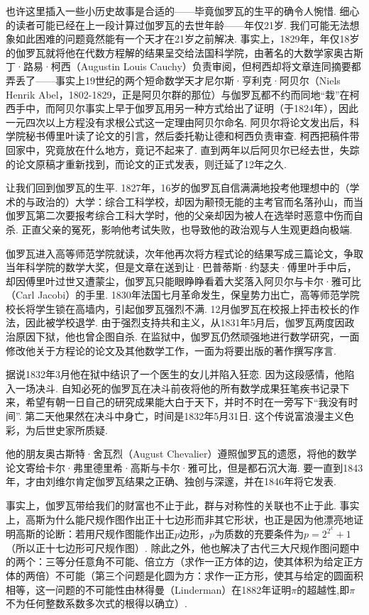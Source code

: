 也许这里插入一些小历史故事是合适的——毕竟伽罗瓦的生平的确令人惋惜. 细心的读者可能已经在上一段计算过伽罗瓦的去世年龄——年仅21岁. 我们可能无法想象如此困难的问题竟然能有一个天才在21岁之前解决. 事实上，1829年，年仅18岁的伽罗瓦就将他在代数方程解的结果呈交给法国科学院，由著名的大数学家奥古斯丁·路易·柯西（Augustin Louis Cauchy）负责审阅，但柯西却将文章连同摘要都弄丢了——事实上19世纪的两个短命数学天才尼尔斯·亨利克·阿贝尔（Niels Henrik Abel，1802-1829，正是阿贝尔群的那位）与伽罗瓦都不约而同地``栽''在柯西手中，而阿贝尔事实上早于伽罗瓦用另一种方式给出了证明（于1824年），因此一元四次以上方程没有求根公式这一定理由阿贝尔命名. 阿贝尔将论文发出后，科学院秘书傅里叶读了论文的引言，然后委托勒让德和柯西负责审查. 柯西把稿件带回家中，究竟放在什么地方，竟记不起来了. 直到两年以后阿贝尔已经去世，失踪的论文原稿才重新找到，而论文的正式发表，则迁延了12年之久.

让我们回到伽罗瓦的生平. 1827年，16岁的伽罗瓦自信满满地投考他理想中的（学术的与政治的）大学：综合工科学校，却因为颟顸无能的主考官而名落孙山，而当伽罗瓦第二次要报考综合工科大学时，他的父亲却因为被人在选举时恶意中伤而自杀. 正直父亲的冤死，影响他考试失败，也导致他的政治观与人生观更趋向极端.

伽罗瓦进入高等师范学院就读，次年他再次将方程式论的结果写成三篇论文，争取当年科学院的数学大奖，但是文章在送到让·巴普蒂斯·约瑟夫·傅里叶手中后，却因傅里叶过世又遭蒙尘，伽罗瓦只能眼睁睁看着大奖落入阿贝尔与卡尔·雅可比（Carl Jacobi）的手里. 1830年法国七月革命发生，保皇势力出亡，高等师范学院校长将学生锁在高墙内，引起伽罗瓦强烈不满. 12月伽罗瓦在校报上抨击校长的作法，因此被学校退学. 由于强烈支持共和主义，从1831年5月后，伽罗瓦两度因政治原因下狱，他也曾企图自杀. 在监狱中，伽罗瓦仍然顽强地进行数学研究，一面修改他关于方程论的论文及其他数学工作，一面为将要出版的著作撰写序言.

据说1832年3月他在狱中结识了一个医生的女儿并陷入狂恋. 因为这段感情，他陷入一场决斗. 自知必死的伽罗瓦在决斗前夜将他的所有数学成果狂笔疾书记录下来，希望有朝一日自己的研究成果能大白于天下，并时不时在一旁写下``我没有时间''. 第二天他果然在决斗中身亡，时间是1832年5月31日. 这个传说富浪漫主义色彩，为后世史家所质疑.

他的朋友奥古斯特·舍瓦烈（August Chevalier）遵照伽罗瓦的遗愿，将他的数学论文寄给卡尔·弗里德里希·高斯与卡尔·雅可比，但是都石沉大海. 要一直到1843年，才由刘维尔肯定伽罗瓦结果之正确、独创与深邃，并在1846年将它发表.

事实上，伽罗瓦带给我们的财富也不止于此，群与对称性的关联也不止于此. 事实上，高斯为什么能尺规作图作出正十七边形而非其它形状，也正是因为他漂亮地证明高斯的论断：若用尺规作图能作出正$p$边形，$p$为质数的充要条件为$p=2^{2^k}+1$（所以正十七边形可尺规作图）. 除此之外，他也解决了古代三大尺规作图问题中的两个：三等分任意角不可能、倍立方（求作一正方体的边，使其体积为给定正方体的两倍）不可能（第三个问题是化圆为方：求作一正方形，使其与给定的圆面积相等，这一问题的不可能性由林得曼（Linderman）在1882年证明$\pi$的超越性,即$\pi$不为任何整数系数多次式的根得以确立）.

